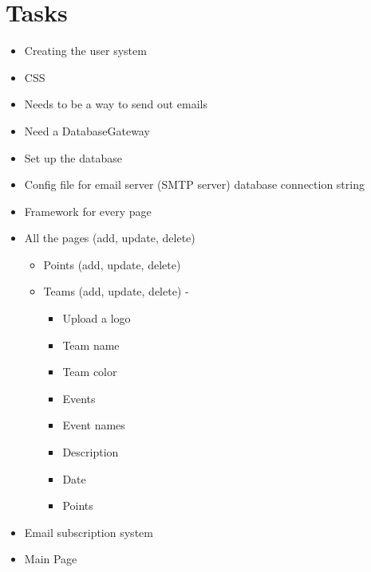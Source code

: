 \documentclass{scrreprt}
\begin{document}
    \section{Tasks}
    \begin{itemize}
        \item Creating the user system
        \item CSS 
        \item Needs to be a way to send out emails
        \item Need a DatabaseGateway
        \item Set up the database
        \item Config file for email server (SMTP server) database connection string
        \item Framework for every page 
        \item All the pages (add, update, delete)
        \begin{itemize}
            \item Points (add, update, delete)
            \item Teams (add, update, delete) -
            \begin{itemize}
                \item Upload a logo
                \item Team name
                \item Team color
            \end{itemize}
            \begin{itemize}
                \item Events
                \item Event names
                \item Description
                \item Date
                \item Points
            \end{itemize}
        \end{itemize}
        \item Email subscription system
        \item Main Page
    \end{itemize}

\end{document}
